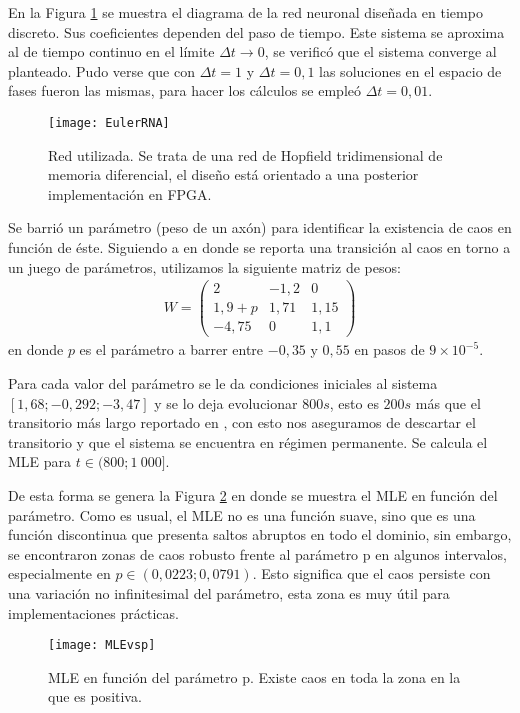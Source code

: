 En la Figura \ref{fig:EulerRNA} se muestra el diagrama de la red neuronal diseñada en tiempo discreto.
Sus coeficientes dependen del paso de tiempo.
Este sistema se aproxima al de tiempo continuo en el límite $\Delta t \rightarrow 0$, se verificó que el sistema converge al planteado.
Pudo verse que con $\Delta t = 1$ y $\Delta t = 0,1$ las soluciones en el espacio de fases fueron las mismas, para hacer los cálculos se empleó $\Delta t = 0,01$.
%
\begin{figure}
	\centering
	\texttt{[image: EulerRNA]}\\
	\caption{Red utilizada. Se trata de una red de Hopfield tridimensional de memoria diferencial, el diseño está orientado a una posterior implementación en FPGA.}\label{fig:EulerRNA}
\end{figure}

Se barrió un parámetro (peso de un axón) para identificar la existencia de caos en función de éste.
Siguiendo a \cite{Yang2003} en donde se reporta una transición al caos en torno a un juego de parámetros, utilizamos la siguiente matriz de pesos:
%
\begin{eqnarray}\label{eq:matrizW}
W =
\left( \begin{array}{ccc}
2 & -1,2 & 0\\
1,9+p & 1,71 & 1,15\\
-4,75 & 0 &1,1
\end{array} \right)
\end{eqnarray}
%
en donde $p$ es el parámetro a barrer entre $-0,35$ y $0,55$ en pasos de $9\times 10^{-5}$.

Para cada valor del parámetro se le da condiciones iniciales al sistema $[1,68; -0,292; -3,47]$ y se lo deja evolucionar $800s$, esto es $200s$ más que el transitorio más largo reportado en \cite{Yang2003}, con esto nos aseguramos de descartar el transitorio y que el sistema se encuentra en régimen permanente.
Se calcula el MLE para $t \in (800;1~000]$.

De esta forma se genera la Figura \ref{fig:MLEvsp} en donde se muestra el MLE en función del parámetro.
Como es usual, el MLE no es una función suave, sino que es una función discontinua que presenta saltos abruptos en todo el dominio, sin embargo, se encontraron zonas de caos robusto frente al parámetro p en algunos intervalos, especialmente en $p \in (0,0223; 0,0791)$.
Esto significa que el caos persiste con una variación no infinitesimal del parámetro, esta zona es muy útil para implementaciones prácticas.
\begin{figure}
	\centering
	\texttt{[image: MLEvsp]}\\
	\caption{MLE en función del parámetro p. Existe caos en toda la zona en la que es positiva.}\label{fig:MLEvsp}
\end{figure}

